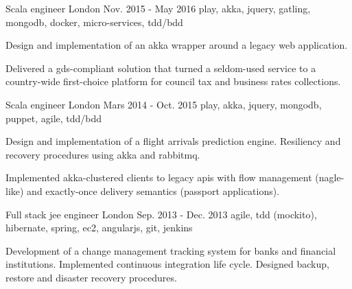 \begin{cventries}
  \cventry
    {Scala engineer} %
    {} %
    {London} %
    {Nov. 2015 - May 2016} %
    {play, akka, jquery, gatling, mongodb, docker, micro-services, tdd/bdd} %
    {
      \begin{cvitems} %
        \item {Design and implementation of an akka wrapper around a legacy web application.}
        \item {Delivered a gds-compliant solution that turned a seldom-used service to a country-wide first-choice platform for council tax and business rates collections.}
      \end{cvitems}
    }

  \cventry
    {Scala engineer} %
    {} %
    {London} %
    {Mars 2014 - Oct. 2015} %
    {play, akka, jquery, mongodb, puppet, agile, tdd/bdd} %
    {
      \begin{cvitems} %
        \item {Design and implementation of a flight arrivals prediction engine. Resiliency and recovery procedures using akka and rabbitmq.}
        \item {Implemented akka-clustered clients to legacy apis with flow management (nagle-like) and exactly-once delivery semantics (passport applications).}
      \end{cvitems}
    }

  \cventry
    {Full stack jee engineer} %
    {} %
    {London} %
    {Sep. 2013 - Dec. 2013} %
    {agile, tdd (mockito), hibernate, spring, ec2, angularjs, git, jenkins} %
    {
      \begin{cvitems} %
        \item {Development of a change management tracking system for banks and financial institutions. Implemented continuous integration life cycle. Designed backup, restore and disaster recovery procedures.}
      \end{cvitems}
    }


\end{cventries}
